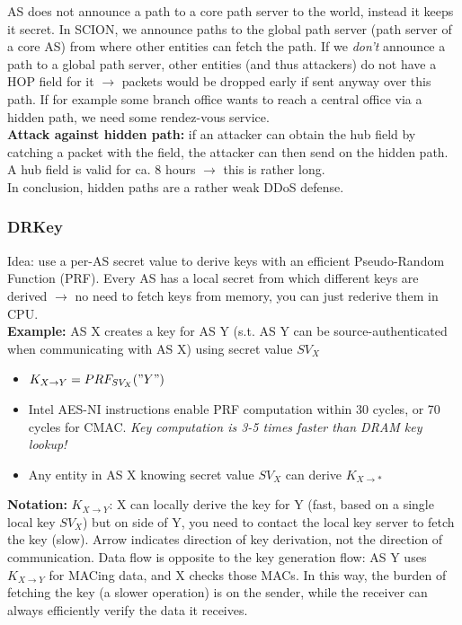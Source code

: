 \documentclass[11pt,oneside,a4paper]{article}
\begin{document}
AS does not announce a path to a core path server to the world, instead it keeps it secret. In SCION, we announce paths to the global path server (path server of a core AS) from where other entities can fetch the path. If we \textit{don't} announce a path to a global path server, other entities (and thus attackers) do not have a HOP field for it $\rightarrow$ packets would be dropped early if sent anyway over this path.
\noindent If for example some branch office wants to reach a central office via a hidden path, we need some rendez-vous service.\\

\noindent \textbf{Attack against hidden path:} if an attacker can obtain the hub field by catching a packet with the field, the attacker can then send on the hidden path. A hub field is valid for ca. 8 hours $\rightarrow$ this is rather long.\\

\noindent In conclusion, hidden paths are a rather weak DDoS defense.

\subsubsection{DRKey}

Idea: use a per-AS secret value to derive keys with an efficient Pseudo-Random Function (PRF). Every AS has a local secret from which different keys are derived $\rightarrow$ no need to fetch keys from memory, you can just rederive them in CPU.\\

\noindent \textbf{Example:} AS X creates a key for AS Y (s.t. AS Y can be source-authenticated when communicating with AS X) using secret value $SV_X$

\vspace{-\topsep}
\begin{itemize}
	\setlength{\itemsep}{0pt}
	\setlength{\parskip}{0pt}
	\item $K_{X\rightarrow Y} = PRF_{SV_X}("Y")$
	\item Intel AES-NI instructions enable PRF computation within 30 cycles, or 70 cycles for CMAC. \textit{Key computation is 3-5 times faster than DRAM key lookup!}
	\item Any entity in AS X knowing secret value $SV_X$ can derive $K_{X\rightarrow *}$
\end{itemize}
\vspace{-\topsep}

\noindent \textbf{Notation:} $K_{X\rightarrow Y}$: X can locally derive the key for Y (fast, based on a single local key $SV_X$) but on side of Y, you need to contact the local key server to fetch the key (slow). Arrow indicates direction of key derivation, not the direction of communication. Data flow is opposite to the key generation flow: AS Y uses $K_{X\rightarrow Y}$ for MACing data, and X checks those MACs. In this way, the burden of fetching the key (a slower operation) is on the
sender, while the receiver can always efficiently verify the data it receives.\\
\end{document}
